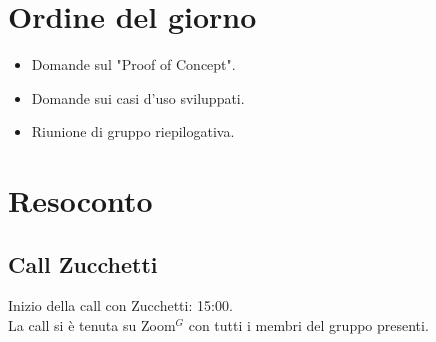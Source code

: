 \section{Ordine del giorno}

\begin{itemize}
	\item Domande sul "Proof of Concept".
	\item Domande sui casi d'uso sviluppati.
	\item Riunione di gruppo riepilogativa.
\end{itemize}

\section{Resoconto}
\label{sec:Resoconto}

\subsection{Call Zucchetti}
\noindent 
Inizio della call con Zucchetti: 15:00. \\
\noindent La call si è tenuta su Zoom$^{G}$ con tutti i membri del gruppo presenti.

